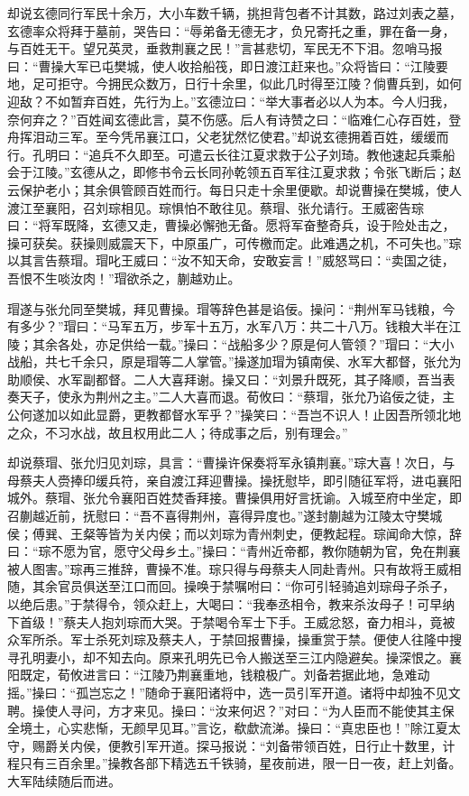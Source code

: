 却说玄德同行军民十余万，大小车数千辆，挑担背包者不计其数，路过刘表之墓，玄德率众将拜于墓前，哭告曰：“辱弟备无德无才，负兄寄托之重，罪在备一身，与百姓无干。望兄英灵，垂救荆襄之民！”言甚悲切，军民无不下泪。忽哨马报曰：“曹操大军已屯樊城，使人收拾船筏，即日渡江赶来也。”众将皆曰：“江陵要地，足可拒守。今拥民众数万，日行十余里，似此几时得至江陵？倘曹兵到，如何迎敌？不如暂弃百姓，先行为上。”玄德泣曰：“举大事者必以人为本。今人归我，奈何弃之？”百姓闻玄德此言，莫不伤感。后人有诗赞之曰：“临难仁心存百姓，登舟挥泪动三军。至今凭吊襄江口，父老犹然忆使君。”却说玄德拥着百姓，缓缓而行。孔明曰：“追兵不久即至。可遣云长往江夏求救于公子刘琦。教他速起兵乘船会于江陵。”玄德从之，即修书令云长同孙乾领五百军往江夏求救；令张飞断后；赵云保护老小；其余俱管顾百姓而行。每日只走十余里便歇。却说曹操在樊城，使人渡江至襄阳，召刘琮相见。琮惧怕不敢往见。蔡瑁、张允请行。王威密告琮曰：“将军既降，玄德又走，曹操必懈弛无备。愿将军奋整奇兵，设于险处击之，操可获矣。获操则威震天下，中原虽广，可传檄而定。此难遇之机，不可失也。”琮以其言告蔡瑁。瑁叱王威曰：“汝不知天命，安敢妄言！”威怒骂曰：“卖国之徒，吾恨不生啖汝肉！”瑁欲杀之，蒯越劝止。

瑁遂与张允同至樊城，拜见曹操。瑁等辞色甚是谄佞。操问：“荆州军马钱粮，今有多少？”瑁曰：“马军五万，步军十五万，水军八万：共二十八万。钱粮大半在江陵；其余各处，亦足供给一载。”操曰：“战船多少？原是何人管领？”瑁曰：“大小战船，共七千余只，原是瑁等二人掌管。”操遂加瑁为镇南侯、水军大都督，张允为助顺侯、水军副都督。二人大喜拜谢。操又曰：“刘景升既死，其子降顺，吾当表奏天子，使永为荆州之主。”二人大喜而退。荀攸曰：“蔡瑁，张允乃谄佞之徒，主公何遂加以如此显爵，更教都督水军乎？”操笑曰：“吾岂不识人！止因吾所领北地之众，不习水战，故且权用此二人；待成事之后，别有理会。”

却说蔡瑁、张允归见刘琮，具言：“曹操许保奏将军永镇荆襄。”琮大喜！次日，与母蔡夫人赍捧印缓兵符，亲自渡江拜迎曹操。操抚慰毕，即引随征军将，进屯襄阳城外。蔡瑁、张允令襄阳百姓焚香拜接。曹操俱用好言抚谕。入城至府中坐定，即召蒯越近前，抚慰曰：“吾不喜得荆州，喜得异度也。”遂封蒯越为江陵太守樊城侯；傅巽、王粲等皆为关内侯；而以刘琮为青州刺史，便教起程。琮闻命大惊，辞曰：“琮不愿为官，愿守父母乡土。”操曰：“青州近帝都，教你随朝为官，免在荆襄被人图害。”琮再三推辞，曹操不准。琮只得与母蔡夫人同赴青州。只有故将王威相随，其余官员俱送至江口而回。操唤于禁嘱咐曰：“你可引轻骑追刘琮母子杀子，以绝后患。”于禁得令，领众赶上，大喝曰：“我奉丞相令，教来杀汝母子！可早纳下首级！”蔡夫人抱刘琮而大哭。于禁喝令军士下手。王威忿怒，奋力相斗，竟被众军所杀。军士杀死刘琮及蔡夫人，于禁回报曹操，操重赏于禁。便使人往隆中搜寻孔明妻小，却不知去向。原来孔明先已令人搬送至三江内隐避矣。操深恨之。襄阳既定，荀攸进言曰：“江陵乃荆襄重地，钱粮极广。刘备若据此地，急难动摇。”操曰：“孤岂忘之！”随命于襄阳诸将中，选一员引军开道。诸将中却独不见文聘。操使人寻问，方才来见。操曰：“汝来何迟？”对曰：“为人臣而不能使其主保全境土，心实悲惭，无颜早见耳。”言讫，欷歔流涕。操曰：“真忠臣也！”除江夏太守，赐爵关内侯，便教引军开道。探马报说：“刘备带领百姓，日行止十数里，计程只有三百余里。”操教各部下精选五千铁骑，星夜前进，限一日一夜，赶上刘备。大军陆续随后而进。

